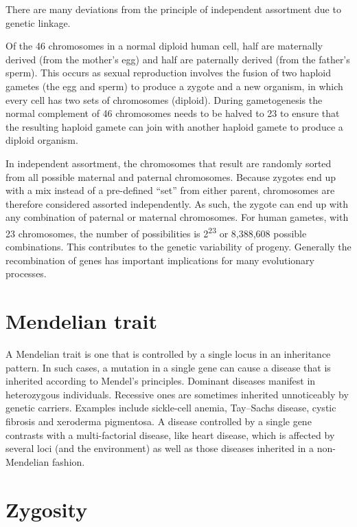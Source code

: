 There are many deviations from the principle of independent assortment due to genetic linkage.

Of the 46 chromosomes in a normal diploid human cell, half are maternally derived (from the mother's egg) and half are paternally derived (from the father's sperm). This occurs as sexual reproduction involves the fusion of two haploid gametes (the egg and sperm) to produce a zygote and a new organism, in which every cell has two sets of chromosomes (diploid). During gametogenesis the normal complement of 46 chromosomes needs to be halved to 23 to ensure that the resulting haploid gamete can join with another haploid gamete to produce a diploid organism.

In independent assortment, the chromosomes that result are randomly sorted from all possible maternal and paternal chromosomes. Because zygotes end up with a mix instead of a pre-defined ``set'' from either parent, chromosomes are therefore considered assorted independently. As such, the zygote can end up with any combination of paternal or maternal chromosomes. For human gametes, with 23 chromosomes, the number of possibilities is 2\textsuperscript{23} or 8,388,608 possible combinations. This contributes to the genetic variability of progeny. Generally the recombination of genes has important implications for many evolutionary processes.

\hypertarget{mendelian-trait}{%
\section{Mendelian trait}\label{mendelian-trait}}

A Mendelian trait is one that is controlled by a single locus in an inheritance pattern. In such cases, a mutation in a single gene can cause a disease that is inherited according to Mendel's principles. Dominant diseases manifest in heterozygous individuals. Recessive ones are sometimes inherited unnoticeably by genetic carriers. Examples include sickle-cell anemia, Tay--Sachs disease, cystic fibrosis and xeroderma pigmentosa. A disease controlled by a single gene contrasts with a multi-factorial disease, like heart disease, which is affected by several loci (and the environment) as well as those diseases inherited in a non-Mendelian fashion.

\hypertarget{zygosity}{%
\section{Zygosity}\label{zygosity}}

